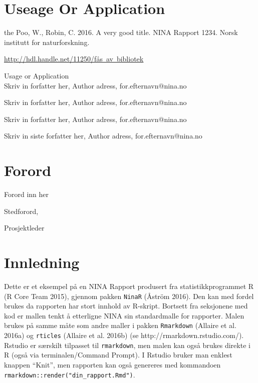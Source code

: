 \documentclass[11pt, a4paper]{article}
\renewcommand*{\href}[2]{\hyperref[#1]{\color{darkblue}\setulcolor{darkblue}\ul{\mbox{#2}}}}
\begin{document}
\setcounter{secnumdepth}{0}
\section{Useage Or Application}
\small{the Poo, W., Robin, C. 2016. A very good
title.} NINA Rapport 1234. Norsk institutt for naturforskning. \par\href{http://hdl.handle.net/11250/fås
av bibliotek}{http://hdl.handle.net/11250/fås av bibliotek}\par
\vspace{0.5cm}
\normalsize{
Usage or Application} \\

\vspace{1cm}
\small
Skriv in forfatter her, Author adress, for.efternavn@nina.no  \par
Skriv in forfatter her, Author adress, for.efternavn@nina.no  \par
Skriv in forfatter her, Author adress, for.efternavn@nina.no  \par
Skriv in siste forfatter her, Author adress, for.efternavn@nina.no  \par
\normalsize
\clearpage


\doublespacing
\tableofcontents
{}
\singlespacing
\clearpage

\section{Forord}

\normalsize
Forord inn her\par
\medskip
Stedforord, \par
\medskip
Prosjektleder



\clearpage
\setcounter{secnumdepth}{4}
\setlength{\parskip}{6pt}

\hypertarget{inl}{%
\section{Innledning}\label{inl}}

Dette er et eksempel på en NINA Rapport produsert fra
statistikkprogrammet R (R Core Team 2015), gjennom pakken \texttt{NinaR}
(Åström 2016). Den kan med fordel brukes da rapporten har stort innhold
av R-skript. Bortsett fra seksjonene med kod er mallen tenkt å
etterligne NINA sin standardmalle for rapporter. Malen brukes på samme
måte som andre maller i pakken \texttt{Rmarkdown} (Allaire et al. 2016a)
og \texttt{rticles} (Allaire et al. 2016b) (se
http://rmarkdown.rstudio.com/). Rstudio er særskilt tilpasset til
\texttt{rmarkdown}, men malen kan også brukes direkte i R (også via
terminalen/Command Prompt). I Rstudio bruker man enklest knappen
``Knit'', men rapporten kan også genereres med kommandoen
\texttt{rmarkdown::render("din\_rapport.Rmd")}.
\end{document}
